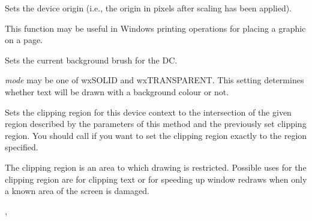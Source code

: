 \label{wxdcsetdeviceorigin}


Sets the device origin (i.e., the origin in pixels after scaling has been
applied).

This function may be useful in Windows printing
operations for placing a graphic on a page.


\label{wxdcsetbackground}


Sets the current background brush for the DC.


\label{wxdcsetbackgroundmode}


{\it mode} may be one of wxSOLID and wxTRANSPARENT. This setting determines
whether text will be drawn with a background colour or not.


\label{wxdcsetclippingregion}





Sets the clipping region for this device context to the intersection of the
given region described by the parameters of this method and the previously set
clipping region. You should call 
 if you want to set
the clipping region exactly to the region specified.

The clipping region is an area to which drawing is restricted. Possible uses
for the clipping region are for clipping text or for speeding up window redraws
when only a known area of the screen is damaged.


, 


\label{wxdcsetpalette}

